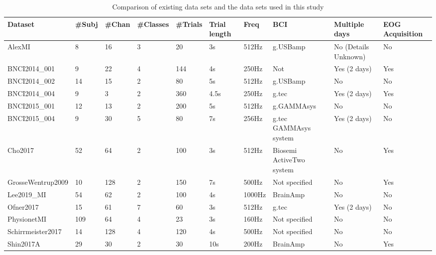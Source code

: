 \documentclass{ieeeaccess}
\begin{document}
    \begin{landscape}
    \begin{table}[tb]
        \caption{Comparison of existing data sets and the data sets used in this study}
        \begin{tabularx}{\linewidth}{|p{2.5cm}|X|X|X|X|X|X|X|X|X|}
        \hline
        \textbf{Dataset} & \textbf{\#Subj} & \textbf{\#Chan} & \textbf{\#Classes} & \textbf{\#Trials} & \textbf{Trial length} & \textbf{Freq} & \textbf{BCI} & \textbf{Multiple days} & \textbf{EOG Acquisition} \\ \hline
        AlexMI\cite{alexandre2006commande} & 8 & 16 & 3 & 20 & 3s & 512Hz & g.USBamp & No (Details Unknown) & No \\ \hline
        BNCI2014\_001\cite{tangermann2012review} & 9 & 22 & 4 & 144 & 4s & 250Hz & Not & Yes (2 days) & Yes \\ \hline
        BNCI2014\_002\cite{steyrl2016random} & 14 & 15 & 2 & 80 & 5s & 512Hz & g.USBamp & No & No \\ \hline
        BNCI2014\_004\cite{leeb2007brain} & 9 & 3 & 2 & 360 & 4.5s & 250Hz & g.tec & Yes (2 days) & Yes \\ \hline
        BNCI2015\_001\cite{faller2012autocalibration} & 12 & 13 & 2 & 200 & 5s & 512Hz & g.GAMMAsys & No & No \\ \hline
        BNCI2015\_004\cite{scherer2015individually} & 9 & 30 & 5 & 80 & 7s & 256Hz & g.tec GAMMAsys system & Yes (2 days) & No \\ \hline
        Cho2017\cite{cho2017eeg} & 52 & 64 & 2 & 100 & 3s & 512Hz & Biosemi ActiveTwo system & No & Yes \\ \hline
        GrosseWentrup2009\cite{grosse2009beamforming} & 10 & 128 & 2 & 150 & 7s & 500Hz & Not specified & No & Yes \\ \hline
        Lee2019\_MI\cite{lee2019eeg} & 54 & 62 & 2 & 100 & 4s & 1000Hz & BrainAmp & No & No \\ \hline
        Ofner2017\cite{ofner2017upper} & 15 & 61 & 7 & 60 & 3s & 512Hz & g.tec & Yes (2 days) & No \\ \hline
        PhysionetMI\cite{schalk2004bci2000} & 109 & 64 & 4 & 23 & 3s & 160Hz & Not specified & No & No \\ \hline
        Schirrmeister2017\cite{schirrmeister2017deep} & 14 & 128 & 4 & 120 & 4s & 500Hz & Not specified & No & No \\ \hline
        Shin2017A\cite{shin2016open} & 29 & 30 & 2 & 30 & 10s & 200Hz & BrainAmp & No & Yes \\ \hline

\end{tabularx}
\end{table}
\end{landscape}
\end{document}
